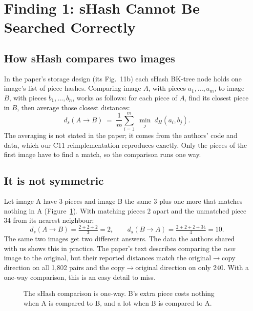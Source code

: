 \section{Finding 1: sHash Cannot Be Searched Correctly}
\label{sec:shash}

\subsection{How sHash compares two images}

In the paper's storage design (its Fig.~11b) each sHash BK-tree node holds one image's list of
piece hashes. Comparing image $A$, with pieces $a_1,\dots,a_m$, to image $B$, with pieces
$b_1,\dots,b_n$, works as follows: for each piece of $A$, find its closest piece in $B$, then
average those closest distances:
\[
  d_s(A \to B) \;=\; \frac{1}{m}\sum_{i=1}^{m}\;\min_{j}\; d_H(a_i, b_j).
\]
The averaging is not stated in the paper; it comes from the authors' code and data, which our
C11 reimplementation reproduces exactly. Only the pieces of the first image have to find a
match, so the comparison runs one way.

\subsection{It is not symmetric}

Let image A have 3 pieces and image B the same 3 plus one more that matches nothing in A
(Figure~\ref{fig:asym}). With matching pieces 2 apart and the unmatched piece 34 from its
nearest neighbour:
\[
  d_s(A\to B) = \tfrac{2+2+2}{3} = 2, \qquad d_s(B\to A) = \tfrac{2+2+2+34}{4} = 10.
\]
The same two images get two different answers. The data the authors shared with us shows this
in practice. The paper's text describes comparing the \emph{new} image to the original, but
their reported distances match the original$\to$copy direction on all 1,802 pairs and the
copy$\to$original direction on only 240. With a one-way comparison, this is an easy detail to
miss.

\begin{figure}[ht]
\centering
{}
\caption{The sHash comparison is one-way. B's extra piece costs nothing when A is compared to
B, and a lot when B is compared to A.}
\label{fig:asym}
\end{figure}

